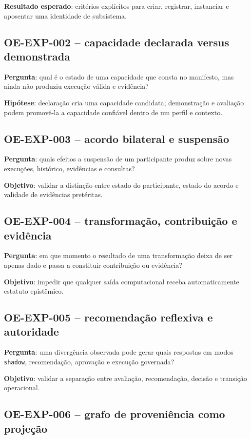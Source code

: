 \documentclass[11pt,a4paper,oneside]{article}
\begin{document}
\textbf{Resultado esperado}: critérios explícitos para criar, registrar, instanciar e aposentar uma identidade de subsistema.

\subsection{OE-EXP-002 -- capacidade declarada versus demonstrada}

\textbf{Pergunta}: qual é o estado de uma capacidade que consta no manifesto, mas ainda não produziu execução válida e evidência?

\textbf{Hipótese}: declaração cria uma capacidade candidata; demonstração e avaliação podem promovê-la a capacidade confiável dentro de um perfil e contexto.

\subsection{OE-EXP-003 -- acordo bilateral e suspensão}

\textbf{Pergunta}: quais efeitos a suspensão de um participante produz sobre novas execuções, histórico, evidências e consultas?

\textbf{Objetivo}: validar a distinção entre estado do participante, estado do acordo e validade de evidências pretéritas.

\subsection{OE-EXP-004 -- transformação, contribuição e evidência}

\textbf{Pergunta}: em que momento o resultado de uma transformação deixa de ser apenas dado e passa a constituir contribuição ou evidência?

\textbf{Objetivo}: impedir que qualquer saída computacional receba automaticamente estatuto epistêmico.

\subsection{OE-EXP-005 -- recomendação reflexiva e autoridade}

\textbf{Pergunta}: uma divergência observada pode gerar quais respostas em modos \texttt{shadow}, recomendação, aprovação e execução governada?

\textbf{Objetivo}: validar a separação entre avaliação, recomendação, decisão e transição operacional.

\subsection{OE-EXP-006 -- grafo de proveniência como projeção}
\end{document}
